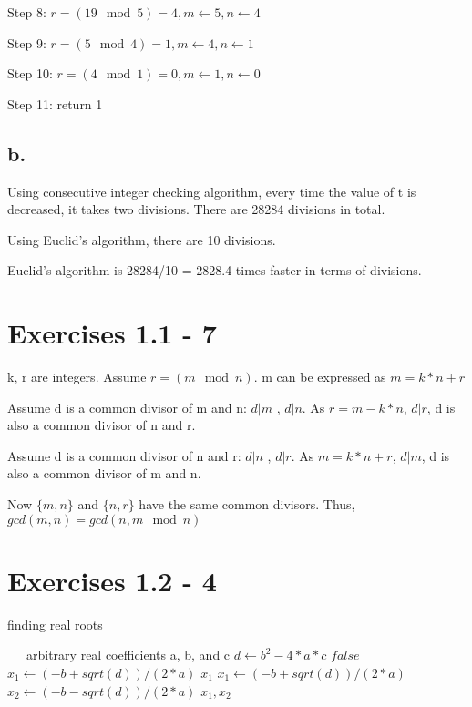\documentclass{article}
\begin{document}
Step 8: $r = (19 \mod 5) = 4, m \leftarrow 5, n \leftarrow 4 $

Step 9: $r = (5 \mod 4) = 1, m \leftarrow 4, n \leftarrow 1 $

Step 10: $r = (4 \mod 1) = 0, m \leftarrow 1, n \leftarrow 0 $

Step 11: return 1

\subsection*{b.}

Using consecutive integer checking algorithm, every time the value of t is decreased, it takes two divisions. There are 28284 divisions in total.

Using Euclid's algorithm, there are 10 divisions.

Euclid's algorithm is 28284/10 = 2828.4 times faster in terms of divisions.

\section{Exercises 1.1 - 7}

k, r are integers. Assume $ r= (m \mod n)$. m can be expressed as $m = k*n +r$

Assume d is a common divisor of m and n: $d |m$ , $d|n$. As $r = m - k*n$, $d | r$, d is also a common divisor of n and r.

Assume d is a common divisor of n and r: $d |n$ , $d|r$. As $m = k*n +r $, $d | m$, d is also a common divisor of m and n.

Now $\{m,n\}$ and $\{n,r\}$ have the same common divisors. Thus, $gcd(m,n) = gcd(n, m \mod n)$



\section{Exercises 1.2 - 4}

\begin{algorithm}
\caption{finding real roots}
\begin{algorithmic}[1]
\Require ~~\
arbitrary real coefficients a, b, and c
\State $ d \leftarrow b^2-4*a*c  $
\Return $false$
\State $ x_1 \leftarrow (-b + sqrt(d))/(2*a)$
\State \Return $x_1$
\State $x_1 \leftarrow (-b + sqrt(d))/(2*a)$
\State $x_2 \leftarrow (-b - sqrt(d))/(2*a)$
\State \Return $ x_1, x_2$
\EndIf
\end{algorithmic}
\end{algorithm}
\end{document}
